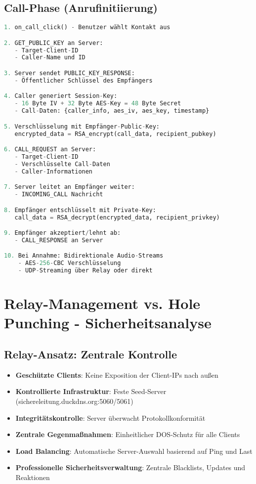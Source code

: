 \documentclass[10pt,a4paper]{article}
\begin{document}
\subsection{Call-Phase (Anrufinitiierung)}
\begin{lstlisting}[language=Python,caption=Anrufablauf]
1. on_call_click() - Benutzer wählt Kontakt aus

2. GET_PUBLIC_KEY an Server:
   - Target-Client-ID
   - Caller-Name und ID

3. Server sendet PUBLIC_KEY_RESPONSE:
   - Öffentlicher Schlüssel des Empfängers

4. Caller generiert Session-Key:
   - 16 Byte IV + 32 Byte AES-Key = 48 Byte Secret
   - Call-Daten: {caller_info, aes_iv, aes_key, timestamp}

5. Verschlüsselung mit Empfänger-Public-Key:
   encrypted_data = RSA_encrypt(call_data, recipient_pubkey)

6. CALL_REQUEST an Server:
   - Target-Client-ID
   - Verschlüsselte Call-Daten
   - Caller-Informationen

7. Server leitet an Empfänger weiter:
   - INCOMING_CALL Nachricht

8. Empfänger entschlüsselt mit Private-Key:
   call_data = RSA_decrypt(encrypted_data, recipient_privkey)

9. Empfänger akzeptiert/lehnt ab:
   - CALL_RESPONSE an Server

10. Bei Annahme: Bidirektionale Audio-Streams
    - AES-256-CBC Verschlüsselung
    - UDP-Streaming über Relay oder direkt
\end{lstlisting}

\section{Relay-Management vs. Hole Punching - Sicherheitsanalyse}

\subsection{Relay-Ansatz: Zentrale Kontrolle}
\begin{itemize}[left=0pt]
\item \textbf{Geschützte Clients}: Keine Exposition der Client-IPs nach außen
\item \textbf{Kontrollierte Infrastruktur}: Feste Seed-Server (sichereleitung.duckdns.org:5060/5061)
\item \textbf{Integritätskontrolle}: Server überwacht Protokollkonformität
\item \textbf{Zentrale Gegenmaßnahmen}: Einheitlicher DOS-Schutz für alle Clients
\item \textbf{Load Balancing}: Automatische Server-Auswahl basierend auf Ping und Last
\item \textbf{Professionelle Sicherheitsverwaltung}: Zentrale Blacklists, Updates und Reaktionen
\end{itemize}
\end{document}
